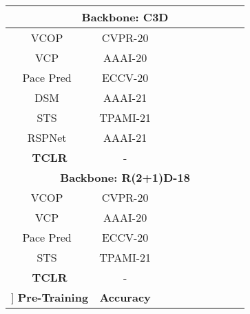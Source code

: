 \documentclass[10pt,twocolumn,letterpaper]{article}
\newcommand{\supstar}{\textsuperscript{\textasteriskcentered}}
\begin{document}
\begin{table*}
\begin{tabular}{cccccccccc}
\hline
\multicolumn{10}{c}{\textbf{Backbone: C3D}} \\
\hline 
VCOP~\cite{vcop}                                     & CVPR-20 &   &   &   &    &   &   &   &    \\
VCP~\cite{vcp}                                       & AAAI-20 &   &   &   &    &   &   &   &    \\
Pace Pred~\cite{pace_pred}                           & ECCV-20 &   &   &   &    &   &   &   &    \\
DSM~\cite{pace_pred}                                   & AAAI-21 &   &   &   &      &   &   &   &      \\
STS\supstar~\cite{statistics2}      & TPAMI-21 &   &   &   &    & \textcolor{blue}{} & \textcolor{blue}{}  &   &    \\
RSPNet~\cite{rspnet}                                     & AAAI-21 &   &   &   &    &   &   &   &    \\
\hline
\textbf{TCLR}                                        & - & \textcolor{red}{} & \textcolor{red}{} & \textcolor{red}{} & \textcolor{red}{}  & \textcolor{red}{} & \textcolor{red}{} & \textcolor{red}{} &  \textcolor{red}{}  \\

\hline

\hline
\multicolumn{10}{c}{\textbf{Backbone: R(2+1)D-18}} \\
\hline 
VCOP~\cite{vcop}                                     & CVPR-20 &   &   &   &    &   &   &   &    \\
VCP~\cite{vcp}                                       & AAAI-20 &   &   &   &    &   &   &   &    \\
Pace Pred~\cite{pace_pred}                           & ECCV-20 &   &   &   &    &   &   &   &    \\
STS\supstar~\cite{statistics2}      & TPAMI-21 & \textcolor{blue}{}  & \textcolor{blue}{}  & \textcolor{blue}{}  & \textcolor{blue}{}   & \textcolor{blue}{}  & \textcolor{blue}{}  & \textcolor{blue}{}  & \textcolor{blue}{}   \\
\hline
\textbf{TCLR}               & - & \textcolor{red}{} & \textcolor{red}{}  & \textcolor{red}{}  & \textcolor{red}{}   & \textcolor{red}{} & \textcolor{red}{}  & \textcolor{red}{}  & \textcolor{red}{}   \\
\hline

\hline

\hline\-3mm]
\textbf{Pre-Training}  & \textbf{Accuracy}  \\
\hline


\end{tabular}
\end{table*}
\end{document}
